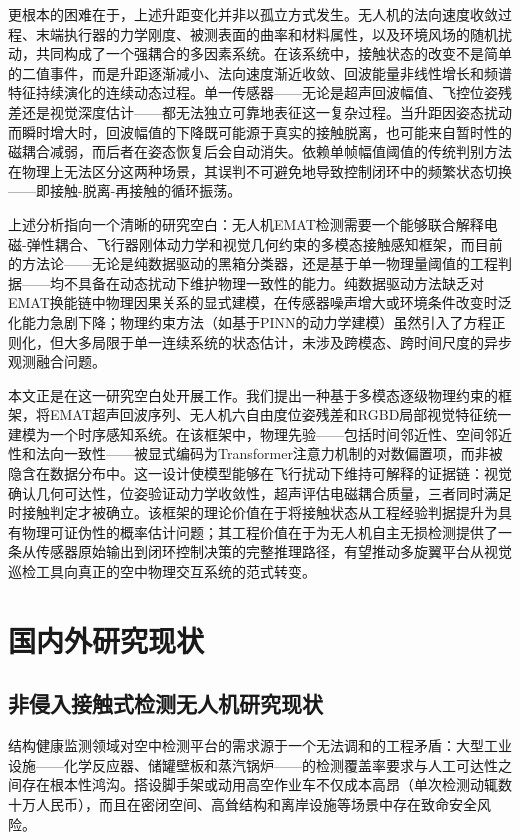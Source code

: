 更根本的困难在于，上述升距变化并非以孤立方式发生。无人机的法向速度收敛过程、末端执行器的力学刚度、被测表面的曲率和材料属性，以及环境风场的随机扰动，共同构成了一个强耦合的多因素系统。在该系统中，接触状态的改变不是简单的二值事件，而是升距逐渐减小、法向速度渐近收敛、回波能量非线性增长和频谱特征持续演化的连续动态过程。单一传感器——无论是超声回波幅值、飞控位姿残差还是视觉深度估计——都无法独立可靠地表征这一复杂过程。当升距因姿态扰动而瞬时增大时，回波幅值的下降既可能源于真实的接触脱离，也可能来自暂时性的磁耦合减弱，而后者在姿态恢复后会自动消失。依赖单帧幅值阈值的传统判别方法在物理上无法区分这两种场景，其误判不可避免地导致控制闭环中的频繁状态切换——即接触-脱离-再接触的循环振荡。

上述分析指向一个清晰的研究空白：无人机EMAT检测需要一个能够联合解释电磁-弹性耦合、飞行器刚体动力学和视觉几何约束的多模态接触感知框架，而目前的方法论——无论是纯数据驱动的黑箱分类器，还是基于单一物理量阈值的工程判据——均不具备在动态扰动下维护物理一致性的能力。纯数据驱动方法缺乏对EMAT换能链中物理因果关系的显式建模，在传感器噪声增大或环境条件改变时泛化能力急剧下降；物理约束方法（如基于PINN的动力学建模）虽然引入了方程正则化，但大多局限于单一连续系统的状态估计，未涉及跨模态、跨时间尺度的异步观测融合问题。

本文正是在这一研究空白处开展工作。我们提出一种基于多模态逐级物理约束的框架，将EMAT超声回波序列、无人机六自由度位姿残差和RGBD局部视觉特征统一建模为一个时序感知系统。在该框架中，物理先验——包括时间邻近性、空间邻近性和法向一致性——被显式编码为Transformer注意力机制的对数偏置项，而非被隐含在数据分布中。这一设计使模型能够在飞行扰动下维持可解释的证据链：视觉确认几何可达性，位姿验证动力学收敛性，超声评估电磁耦合质量，三者同时满足时接触判定才被确立。该框架的理论价值在于将接触状态从工程经验判据提升为具有物理可证伪性的概率估计问题；其工程价值在于为无人机自主无损检测提供了一条从传感器原始输出到闭环控制决策的完整推理路径，有望推动多旋翼平台从视觉巡检工具向真正的空中物理交互系统的范式转变。

\section{国内外研究现状}

\subsection{非侵入接触式检测无人机研究现状}

结构健康监测领域对空中检测平台的需求源于一个无法调和的工程矛盾：大型工业设施——化学反应器、储罐壁板和蒸汽锅炉——的检测覆盖率要求与人工可达性之间存在根本性鸿沟。搭设脚手架或动用高空作业车不仅成本高昂（单次检测动辄数十万人民币），而且在密闭空间、高耸结构和离岸设施等场景中存在致命安全风险。

